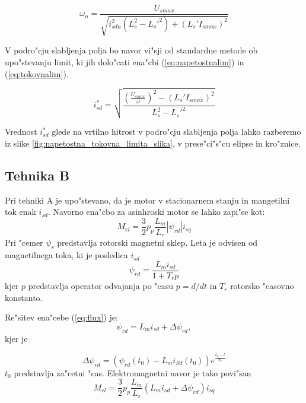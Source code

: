 \documentclass[journal,a4paper,twoside]{sty/IEEEtran}
\begin{document}
\begin{equation}
\omega_n=\frac{{U}_{smax}}{\sqrt{i_{sdn}^{2}(L_s^2-L_s'^2)+(L_s'I_{smax})^2}}
\label{nazivnaw}
\end{equation}



V podro"cju slabljenja polja bo navor vi"sji od standardne metode ob upo"stevanju limit, ki jih dolo"cati ena"cbi (\ref{eq:napetostnalim}) in (\ref{eq:tokovnalim}). 

\begin{equation}
\label{eq:zeljentok1}
i_{sd}^*=\sqrt{\frac{(\frac{U_{smax}}{\omega})^2-(L_s'I_{smax})^2}{L_s^2-L_s'^2}}
\end{equation}

Vrednost $i_{sd}^*$ glede na vrtilno hitrost v podro"cju slabljenja polja lahko razberemo iz slike \ref{fig:napetostna_tokovna_limita_slika}, v prese"ci"s"cu elipse in kro"znice. 



\subsection{Tehnika B}
\label{sec:druga_metoda}

Pri tehniki A je upo"stevano, da je motor v stacionarnem stanju in mangetilni tok enak $i_{sd}$.
Navorno ena"cbo za asinhroski motor se lahko zapi"se kot:\cite{servopogoni}
\begin{equation}
\label{eq:navor2}
M_{el}=\frac{3}{2}p_p \frac{L_m}{L_r}|\psi_{rd}|i_{sq}
\end{equation}
Pri "cemer $\psi_{r}$ predstavlja rotorski magnetni sklep. Leta je odvisen od magnetilnega toka, ki je posledica $i_{sd}$
\begin{equation}
\label{eq:flux}
\psi_{rd}= \frac{L_m i_{sd}}{1+T_r p}
\end{equation}
kjer $p$ predstavlja operator odvajanja po "casu $p=d/dt$ in $T_r$ rotorsko "casovno konstanto.

Re"sitev ena"cebe (\ref{eq:flux}) je:
\begin{equation}
\label{eq:Lm+delta}
\psi_{rd}=L_m i_{sd}+\Delta \psi_{rd}\mathrm{,}
\end{equation}
 kjer je
 
 \begin{equation}
\label{eq:delta}
\Delta \psi_{rd}=(\psi_{rd}(t_0)-L_m i_{Sd}(t_0))e^{\frac{t_0-t}{T_r}}
\end{equation}
$t_0$ predstavlja za"cetni "cas. Elektromagnetni navor je tako povi"san
\begin{equation}
\label{navor3}
M_{el}=\frac{3}{2}p_p \frac{L_m}{L_r}(L_m i_{sd}+\Delta \psi_{rd})i_{sq}
\end{equation}
\end{document}
